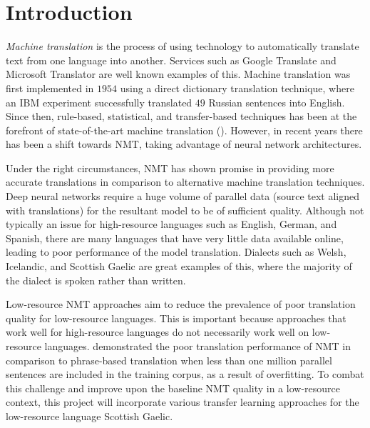 \chapter{Introduction}
\label{introduction}
\textit{Machine translation} is the process of using technology to automatically translate text from one language into another. Services such as Google Translate and Microsoft Translator are well known examples of this. 
Machine translation was first implemented in $1954$ using a direct dictionary translation technique, where an IBM experiment successfully translated $49$ Russian sentences into English.
Since then, rule-based, statistical, and transfer-based techniques has been at the forefront of state-of-the-art machine translation (\cite{chiang_phrase_2005}). However, in recent years there has been a shift towards \Gls{NMT}, taking advantage of neural network architectures.

Under the right circumstances, \acrshort{NMT} has shown promise in providing more accurate translations in comparison to alternative machine translation techniques. Deep neural networks require a huge volume of parallel data (source text aligned with translations) for the resultant model to be of sufficient quality. Although not typically an issue for high-resource languages such as English, German, and Spanish, there are many languages that have very little data available online, leading to poor performance of the model translation. Dialects such as Welsh, Icelandic, and Scottish Gaelic are great examples of this, where the majority of the dialect is spoken rather than written.

Low-resource \acrshort{NMT} approaches aim to reduce the prevalence of poor translation quality for low-resource languages.
This is important because approaches that work well for high-resource languages do not necessarily work well on low-resource languages. \cite{koehn_six_2017} demonstrated the poor translation performance of \acrshort{NMT} in comparison to phrase-based translation when less than one million parallel sentences are included in the training corpus, as a result of overfitting. To combat this challenge and improve upon the baseline \acrshort{NMT} quality in a low-resource context, this project will incorporate various transfer learning approaches for the low-resource language Scottish Gaelic.


